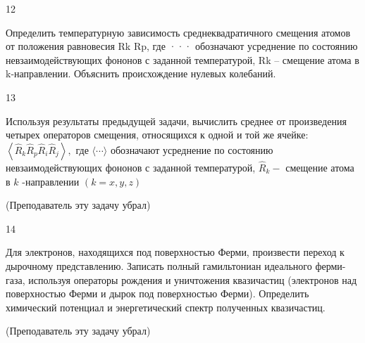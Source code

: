 \documentclass[a4paper,12pt]{article} %
\begin{document}
\begin{task}

12

Определить температурную зависимость среднеквадратичного смещения атомов от положения равновесия Rk Rp, где ··· обозначают усреднение по состоянию невзаимодействующих фононов с заданной температурой,  Rk – смещение атома в k-направлении. Объяснить происхождение нулевых колебаний.













\end{task}


\begin{task}

13

Используя результаты предыдущей задачи, вычислить среднее от произведения четырех операторов смещения, относящихся к одной и той же ячейке: $\left\langle\hat{R}_{k} \hat{R}_{p} \hat{R}_{i} \hat{R}_{j}\right\rangle,$ где $\langle\cdots\rangle$ обозначают усреднение по состоянию невзаимодействующих фононов с заданной температурой, $\hat{R}_{k}-$ смещение атома в $k$ -направлении $(k=x, y, z)$

(Преподаватель эту задачу убрал)














\end{task}


\begin{task}

14

Для электронов, находящихся под поверхностью Ферми, произвести переход к дырочному представлению. Записать полный гамильтониан идеального ферми-газа, используя операторы рождения и уничтожения квазичастиц (электронов над поверхностью Ферми и дырок под поверхностью Ферми). Определить химический потенциал и энергетический спектр полученных квазичастиц. 



(Преподаватель эту задачу убрал)










\end{task}
\end{document}
